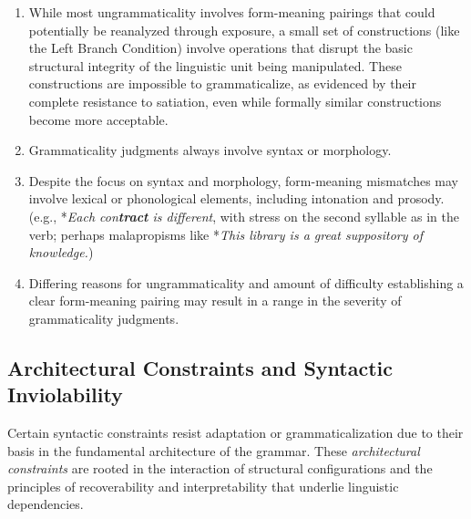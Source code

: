 \begin{enumerate}
\begin{enumerate}
        \item Structural motivations due to
        \begin{enumerate}
            \item processing constraints \\(e.g., length, embedding, long dependency distances)
            \item lack of clarity \\(e.g., after loss of inflectional endings, Jespersen's cycle, etc.)
            \item structural analogy \\(e.g., \textsuperscript{?}\textit{I asked about what did she do.})
        \end{enumerate}
        \item Iconic usage in rare instances \\(e.g., trilled /r/)
    \end{enumerate}
    \item While most ungrammaticality involves form-meaning pairings that could potentially be reanalyzed through exposure, a small set of constructions (like the Left Branch Condition) involve operations that disrupt the basic structural integrity of the linguistic unit being manipulated. These constructions are impossible to grammaticalize, as evidenced by their complete resistance to satiation, even while formally similar constructions become more acceptable.
    \item Grammaticality judgments always involve syntax or morphology.
    \item Despite the focus on syntax and morphology, form-meaning mismatches may involve lexical or phonological elements, including intonation and prosody. \\(e.g., *\textit{Each con\textbf{tract} is different}, with stress on the second syllable as in the verb; perhaps malapropisms like *\textit{This library is a great suppository of knowledge.})
    \item Differing reasons for ungrammaticality and amount of difficulty establishing a clear form-meaning pairing may result in a range in the severity of grammaticality judgments.
\end{enumerate}

\subsection{Architectural Constraints and Syntactic Inviolability}
Certain syntactic constraints resist adaptation or grammaticalization due to their basis in the fundamental architecture of the grammar. These \emph{architectural constraints} are rooted in the interaction of structural configurations and the principles of recoverability and interpretability that underlie linguistic dependencies.

